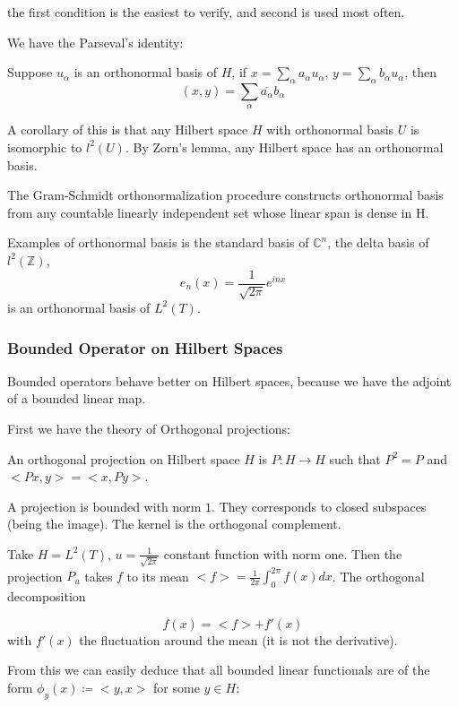 \documentclass[main.tex]{subfiles}
\begin{document}
\begin{theorem}[Projection]
\begin{remark}
the first condition is the easiest to verify, and second is used most often. 
\end{remark}

We have the Parseval's identity:
\begin{theorem}
Suppose $u_\alpha$ is an orthonormal basis of $H$, if $x = \sum_\alpha a_\alpha u_\alpha$, $y = \sum_\alpha b_\alpha u_\alpha$, then 
$$
(x,y) = \sum_\alpha \overline{a_\alpha} b_{\alpha}
$$
\end{theorem}

A corollary of this is that any Hilbert space $H$ with orthonormal basis $U$  is isomorphic to $l^2(U)$. By Zorn's lemma, any Hilbert space has an orthonormal basis.

The Gram-Schmidt orthonormalization procedure constructs orthonormal basis from any countable linearly independent set whose linear span is dense in H.


Examples of orthonormal basis is the standard basis of $\mathbb{C}^n$, the delta basis of $l^2(\mathbb{Z})$, 
$$
e_n(x) = \frac{1}{\sqrt{2\pi}} e^{inx}
$$
is an orthonormal basis of $L^2(T)$. 


\end{theorem}

\subsubsection{Bounded Operator on Hilbert Spaces}
Bounded operators behave better on Hilbert spaces, because we have the adjoint of a bounded linear map. 

First we have the theory of Orthogonal projections:

\begin{definition}
An orthogonal projection on Hilbert space $H$ is $P : H \rightarrow H$ such that $P^2= P$ and $<Px, y> = <x, Py>$. 
\end{definition}
A projection is bounded with norm $1$. They corresponds to closed subspaces (being the image). The kernel is the orthogonal complement.

\begin{example}
Take $H = L^2(T)$, $u = \frac{1}{\sqrt{2 \pi}}$ constant function with norm one. Then the projection $P_u$ takes $f$ to its mean $<f> = \frac{1}{2 \pi} \int_0 ^{2\pi} f(x) dx$. The orthogonal decomposition 

$$
f(x) = <f> + f'(x)
$$
with $f'(x)$ the fluctuation around the mean (it is not the derivative).
\end{example}
From this we can easily deduce that all bounded linear functionals are of the form $\phi_y(x) \coloneqq <y, x>$ for some $y \in H$:
\end{document}
